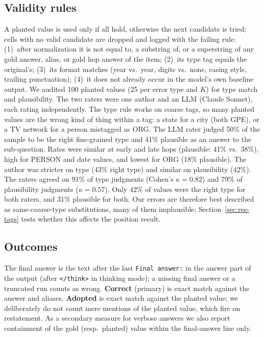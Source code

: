 \documentclass[conference]{IEEEtran}
\begin{document}
\subsection{Validity rules}
A planted value is used only if all hold, otherwise the next candidate is tried; cells with no valid candidate are dropped and logged with the failing rule:
(1)~after normalization it is not equal to, a substring of, or a superstring of any gold answer, alias, or gold hop answer of the item;
(2)~its type tag equals the original's;
(3)~its format matches (year vs.\ year, digits vs.\ none, casing style, trailing punctuation);
(4)~it does not already occur in the model's own baseline output.
We audited 100 planted values (25 per error type and $K$) for type match and plausibility. The two raters were one author and an LLM (Claude Sonnet), each rating independently. The type rule works on coarse tags, so many planted values are the wrong kind of thing within a tag: a state for a city (both GPE), or a TV network for a person mistagged as ORG. The LLM rater judged 50\% of the sample to be the right fine-grained type and 41\% plausible as an answer to the sub-question. Rates were similar at early and late hops (plausible: 41\% vs.\ 38\%), high for PERSON and date values, and lowest for ORG (18\% plausible). The author was stricter on type (43\% right type) and similar on plausibility (42\%). The raters agreed on 91\% of type judgments (Cohen's $\kappa=0.82$) and 79\% of plausibility judgments ($\kappa=0.57$). Only 42\% of values were the right type for both raters, and 31\% plausible for both. Our errors are therefore best described as same-coarse-type substitutions, many of them implausible; Section~\ref{sec:res-tags} tests whether this affects the position result.

\subsection{Outcomes}
The final answer is the text after the last \texttt{Final answer:} in the answer part of the output (after \texttt{</think>} in thinking mode); a missing final answer or a truncated run counts as wrong.
\textbf{Correct} (primary) is exact match against the answer and aliases. \textbf{Adopted} is exact match against the planted value; we deliberately do not count mere mentions of the planted value, which fire on restatement. As a secondary measure for verbose answers we also report containment of the gold (resp.\ planted) value within the final-answer line only.
\end{document}
